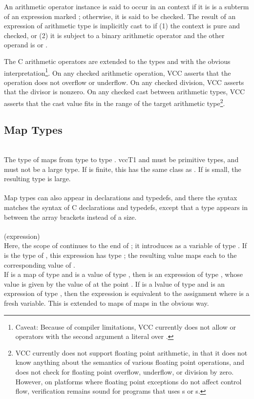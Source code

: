 \documentclass[preprint,nocopyrightspace]{sigplanconf}
\begin{document}
{{An arithmetic operator instance is said to occur in
an \vcc{\unchecked} context if it is is a subterm of an expression
marked ; otherwise, it is said to be checked. The
result of an expression of arithmetic type is implicitly cast
to \vcc{\integer} if (1) the context is pure and checked, or (2) it is
subject to a binary arithmetic operator and the other operand
is \vcc{\natural} or \vcc{\integer}.

The C arithmetic operators are extended to the types \vcc{\natural}
and \vcc{\integer} with the obvious interpretation\footnote{
Caveat: Because of compiler limitations, VCC currently does not allow
\vcc{<<} or \vcc{>>} operators with the second argument a literal over .
}. 
On any checked arithmetic operation, VCC asserts that the operation
does not overflow or underflow. On any checked division, VCC asserts
that the divisor is nonzero. On any checked cast between arithmetic
types, VCC asserts that the cast value fits in the range of the target
arithmetic type\footnote{
VCC currently does not support floating point arithmetic, in that it
does not know anything about the semantics of various floating point
operations, and does not check for floating point overflow, underflow,
or division by zero. However, on platforms where floating point
exceptions do not affect control flow, verification remains sound for
programs that uses s or s.
}.

\subsection{Map Types}
\\
The type of maps from type  to type . 
vcc{T1} and  must be primitive types, and  must
not be a large type. If  is finite, this has the same class
as . If  is small, the resulting type is large.
\\\\
Map types can also appear in
declarations and typedefs, and there the syntax matches the syntax of
C declarations and typedefs, except that a type appears in between the
array brackets instead of a size.
\\\\
 (expression)\\
Here, the scope of  continues to the end of ; it
introduces  as a variable of type . 
If  is the
type of , this expression has type ; the resulting
value maps each  to the corresponding value of .
\\
If  is a map of
type  and  is a value of type ,
then  is an expression of type , whose value is
given by the value of  at the point . If  is a
lvalue of type  and  is an expression of
type , then the expression  is equivalent to
the assignment 
where  is a fresh variable. This is extended to maps of maps in
the obvious way.

}}
\end{document}
